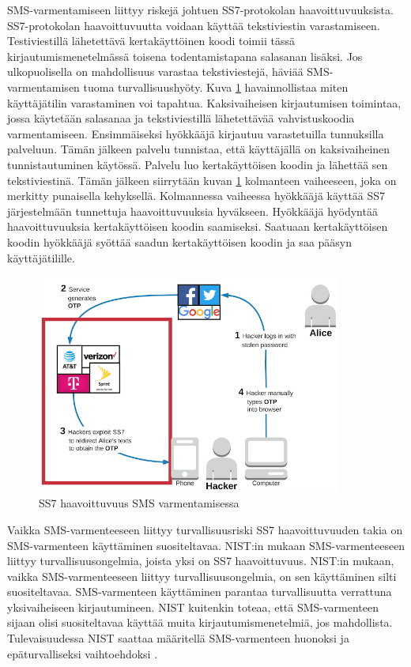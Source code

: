 SMS-varmentamiseen liittyy riskejä johtuen SS7-protokolan haavoittuvuuksista. SS7-protokolan haavoittuvuutta voidaan käyttää tekstiviestin varastamiseen. Testiviestillä lähetettävä kertakäyttöinen koodi toimii tässä kirjautumismenetelmässä toisena todentamistapana salasanan lisäksi. Jos ulkopuolisella on mahdollisuus varastaa tekstiviestejä, häviää SMS-varmentamisen tuoma turvallisuushyöty. Kuva \ref{fig:ss7SMSM} havainnollistaa miten käyttäjätilin varastaminen voi tapahtua. Kaksivaiheisen kirjautumisen toimintaa, jossa käytetään salasanaa ja tekstiviestillä lähetettävää vahvistuskoodia varmentamiseen. Ensimmäiseksi hyökkääjä kirjautuu varastetuilla tunnuksilla palveluun. Tämän jälkeen palvelu tunnistaa, että käyttäjällä on kaksivaiheinen tunnistautuminen käytössä. Palvelu luo kertakäyttöisen koodin ja lähettää sen tekstiviestinä. Tämän jälkeen siirrytään kuvan \ref{fig:ss7SMSM} kolmanteen vaiheeseen, joka on merkitty punaisella kehyksellä. Kolmannessa vaiheessa hyökkääjä käyttää SS7 järjestelmään tunnettuja haavoittuvuuksia hyväkseen. Hyökkääjä hyödyntää haavoittuvuuksia kertakäyttöisen koodin saamiseksi. Saatuaan kertakäyttöisen koodin hyökkääjä syöttää saadun kertakäyttöisen koodin ja saa pääsyn käyttäjätilille. 

\begin{figure}[ht]
    \centering
    \includegraphics[width=10cm]{template/figures/SS7 attack vulnerable.png}
    \caption{SS7 haavoittuvuus SMS varmentamisessa \citep{2FA_SMS}}
    \label{fig:ss7SMSM}
\end{figure}

Vaikka SMS-varmenteeseen liittyy turvallisuusriski SS7 haavoittuvuuden takia on SMS-varmenteen käyttäminen suositeltavaa. NIST:in mukaan SMS-varmenteeseen liittyy turvallisuusongelmia, joista yksi on SS7 haavoittuvuus. NIST:in mukaan, vaikka SMS-varmenteeseen liittyy turvallisuusongelmia, on sen käyttäminen silti suositeltavaa. SMS-varmenteen käyttäminen parantaa turvallisuutta verrattuna yksivaiheiseen kirjautumineen. NIST kuitenkin toteaa, että SMS-varmenteen sijaan olisi suositeltavaa käyttää muita kirjautumismenetelmiä, jos mahdollista. Tulevaisuudessa NIST saattaa määritellä SMS-varmenteen huonoksi ja epäturvalliseksi vaihtoehdoksi \citep{NIST_800_63B}.



